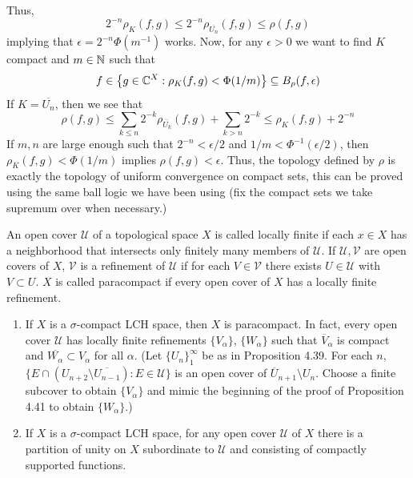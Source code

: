 \documentclass[12pt,a4paper]{article}
\begin{document}
\begin{solution}
\begin{enumerate}[label=\alph*.]
        Thus,
        \[
            2^{-n}\rho_K(f,g)\leq 2^{-n}\rho_{ \overline{U_n}}(f,g)\leq\rho(f,g)
        \]
        implying that $\epsilon=2^{-n}\Phi(m^{-1})$ works. 
        Now, for any $\epsilon>0$ we want to find $K$ compact and $m\in\mathbb{N}$ such that
        \[
            f\in\qty{g\in\mathbb{C}^X:\rho_K(f,g)<\Phi(1/m)} \subseteq B_\rho(f,\epsilon)
        \]
        If $K= \overline{U_n}$, then we see that 
        \[
            \rho(f,g)\leq\sum_{k\leq n}2^{-k}\rho_{ \overline{U_k}}(f,g)+\sum_{k>n}2^{-k}\leq\rho_{ K}(f,g)+2^{-n}
        \]
        If $m,n$ are large enough such that $2^{-n}<\epsilon/2$ and $1/m<\Phi^{-1}(\epsilon/2)$, then $\rho_{K}(f,g) < \Phi(1/m)$ implies $\rho(f,g) < \epsilon$. 
        Thus, the topology defined by $\rho$ is exactly the topology of uniform convergence on compact sets, this can be proved using the same ball logic we have been using (fix the compact sets we take supremum over when necessary.)  
\end{enumerate}
\end{solution}
\begin{problem}\label{prob:4-57}
An open cover $\mathcal{U}$ of a topological space $X$ is called locally finite if each $x \in X$ has a neighborhood that intersects only finitely many members of $\mathcal{U}$. If $\mathcal{U}, \mathcal{V}$ are open covers of $X$, $\mathcal{V}$ is a refinement of $\mathcal{U}$ if for each $V \in \mathcal{V}$ there exists $U \in \mathcal{U}$ with $V \subset U$. $X$ is called paracompact if every open cover of $X$ has a locally finite refinement.
\begin{enumerate}[label=\alph*.]
    \item If $X$ is a $\sigma$-compact LCH space, then $X$ is paracompact. In fact, every open cover $\mathcal{U}$ has locally finite refinements $\{V_{\alpha}\}$, $\{W_{\alpha}\}$ such that $\overline{V}_{\alpha}$ is compact and $\overline{W_{\alpha}} \subset V_{\alpha}$ for all $\alpha$. (Let $\{U_n\}_{1}^\infty$ be as in Proposition 4.39. For each $n$, $\{E \cap (U_{n+2} \setminus \overline{U_{n-1}}) : E \in \mathcal{U}\}$ is an open cover of $\overline{U}_{n+1} \setminus U_n$. Choose a finite subcover to obtain $\{V_{\alpha}\}$ and mimic the beginning of the proof of Proposition 4.41 to obtain $\{W_{\alpha}\}$.)
    \item If $X$ is a $\sigma$-compact LCH space, for any open cover $\mathcal{U}$ of $X$ there is a partition of unity on $X$ subordinate to $\mathcal{U}$ and consisting of compactly supported functions.
\end{enumerate}
\end{problem}
\end{document}
